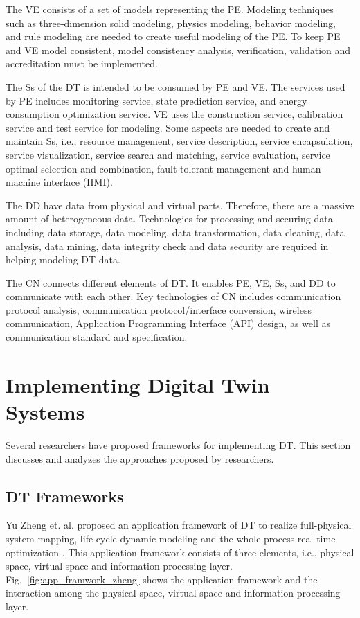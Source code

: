 \documentclass[article]{aaltoseries}
\begin{document}
The VE consists of a set of models representing the PE. Modeling techniques such as three-dimension solid modeling, physics modeling, behavior modeling, and rule modeling are needed to create useful modeling of the PE. To keep PE and VE model consistent, model consistency analysis, verification, validation and accreditation must be implemented.

The Ss of the DT is intended to be consumed by PE and VE. The services used by PE includes monitoring service, state prediction service, and energy consumption optimization service. VE uses the construction service, calibration service and test service for modeling. Some aspects are needed to create and maintain Ss, i.e., resource management, service description, service encapsulation, service visualization, service search and matching, service evaluation, service optimal selection and combination, fault-tolerant management and human-machine interface (HMI).

The DD have data from physical and virtual parts. Therefore, there are a massive amount of heterogeneous data. Technologies for processing and securing data including data storage, data modeling, data transformation, data cleaning, data analysis, data mining, data integrity check and data security are required in helping modeling DT data.

The CN connects different elements of DT. It enables PE, VE, Ss, and DD to communicate with each other. Key technologies of CN includes communication protocol analysis, communication protocol/interface conversion, wireless communication, Application Programming Interface (API) design, as well as communication standard and specification.

\section{Implementing Digital Twin Systems}
Several researchers have proposed frameworks for implementing DT. This section discusses and analyzes the approaches proposed by researchers.

\subsection{DT Frameworks}
Yu Zheng et. al. proposed an application framework of DT to realize full-physical system mapping, life-cycle dynamic modeling and the whole process real-time optimization \cite{zheng2019application}. This application framework consists of three elements, i.e., physical space, virtual space and information-processing layer. Fig.~\ref{fig:app_framwork_zheng} shows the application framework and the interaction among the physical space, virtual space and information-processing layer.
\end{document}
